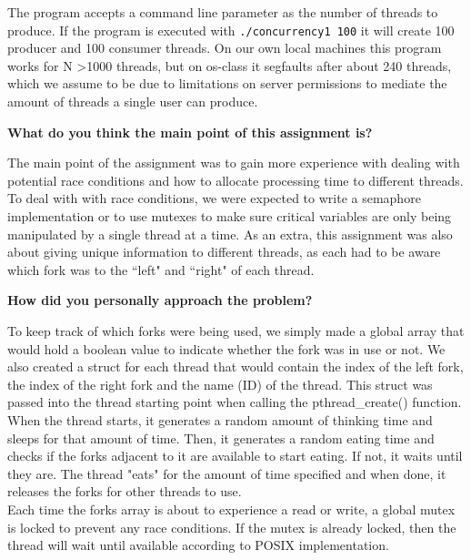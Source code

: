 \documentclass[10pt,letterpaper,draftclsnofoot,onecolumn]{IEEEtran}
\begin{document}
\medskip

\noindent The program accepts a command line parameter as the number of threads to produce. If the program is executed with \texttt{./concurrency1 100} it will create 100 producer and 100 consumer threads. On our own local machines this program works for N \textgreater 1000 threads, but on os-class it segfaults after about 240 threads, which we assume to be due to limitations on server permissions to mediate the amount of threads a single user can produce.\par
\bigskip

\bigskip

\noindent\textbf{What do you think the main point of this assignment is?}
\medskip

\noindent The main point of the assignment was to gain more experience with dealing with potential race conditions and how to allocate processing time to different threads. To deal with with race conditions, we were expected to write a semaphore implementation or to use mutexes to make sure critical variables are only being manipulated by a single thread at a time. As an extra, this assignment was also about giving unique information to different threads, as each had to be aware which fork was to the ``left" and ``right" of each thread.
\medskip

\bigskip

\noindent\textbf{How did you personally approach the problem?}
\medskip

\noindent To keep track of which forks were being used, we simply made a global array that would hold a boolean value to indicate whether the fork was in use or not. We also created a struct for each thread that would contain the index of the left fork, the index of the right fork and the name (ID) of the thread. This struct was passed into the thread starting point when calling the pthread\_create() function.\\
\medskip
\noindent When the thread starts, it generates a random amount of thinking time and sleeps for that amount of time. Then, it generates a random eating time and checks if the forks adjacent to it are available to start eating. If not, it waits until they are. The thread "eats" for the amount of time specified and when done, it releases the forks for other threads to use.\\
\medskip
\noindent Each time the forks array is about to experience a read or write, a global mutex is locked to prevent any race conditions. If the mutex is already locked, then the thread will wait until available according to POSIX implementation.\\
\end{document}
